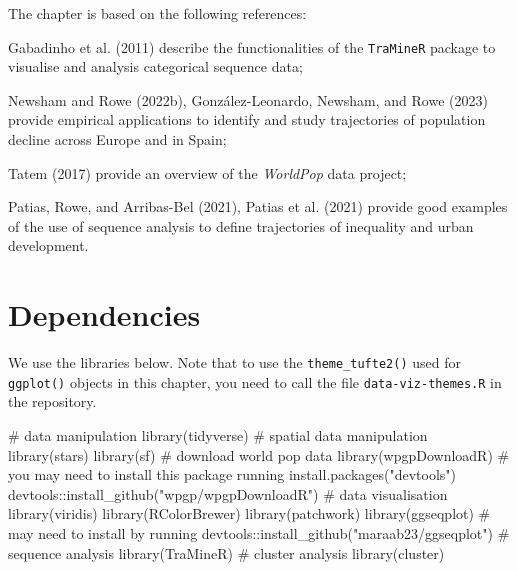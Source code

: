 \documentclass[
  letterpaper,
  DIV=11,
  numbers=noendperiod]{scrreprt}
\newenvironment{Shaded}{\begin{snugshade}}{\end{snugshade}}
\newcommand{\CommentTok}[1]{\textcolor[rgb]{0.37,0.37,0.37}{#1}}
\newcommand{\FunctionTok}[1]{\textcolor[rgb]{0.28,0.35,0.67}{#1}}
\newcommand{\NormalTok}[1]{\textcolor[rgb]{0.00,0.23,0.31}{#1}}
\begin{document}
The chapter is based on the following references:

Gabadinho et al. (2011) describe the functionalities of the
\texttt{TraMineR} package to visualise and analysis categorical sequence
data;

Newsham and Rowe (2022b), González-Leonardo, Newsham, and Rowe (2023)
provide empirical applications to identify and study trajectories of
population decline across Europe and in Spain;

Tatem (2017) provide an overview of the \emph{WorldPop} data project;

Patias, Rowe, and Arribas-Bel (2021), Patias et al. (2021) provide good
examples of the use of sequence analysis to define trajectories of
inequality and urban development.

\hypertarget{dependencies}{%
\section{Dependencies}\label{dependencies}}

We use the libraries below. Note that to use the
\texttt{theme\_tufte2()} used for \texttt{ggplot()} objects in this
chapter, you need to call the file \texttt{data-viz-themes.R} in the
repository.

\begin{Shaded}
\begin{Highlighting}[]
\CommentTok{\# data manipulation}
\FunctionTok{library}\NormalTok{(tidyverse)}
\CommentTok{\# spatial data manipulation}
\FunctionTok{library}\NormalTok{(stars)}
\FunctionTok{library}\NormalTok{(sf)}
\CommentTok{\# download world pop data}
\FunctionTok{library}\NormalTok{(wpgpDownloadR) }\CommentTok{\# you may need to install this package running \textasciigrave{}install.packages("devtools")\textasciigrave{} \textasciigrave{}devtools::install\_github("wpgp/wpgpDownloadR")\textquotesingle{}}
\CommentTok{\# data visualisation}
\FunctionTok{library}\NormalTok{(viridis)}
\FunctionTok{library}\NormalTok{(RColorBrewer)}
\FunctionTok{library}\NormalTok{(patchwork)}
\FunctionTok{library}\NormalTok{(ggseqplot) }\CommentTok{\# may need to install by running \textasciigrave{}devtools::install\_github("maraab23/ggseqplot")\textasciigrave{}}
\CommentTok{\# sequence analysis}
\FunctionTok{library}\NormalTok{(TraMineR)}
\CommentTok{\# cluster analysis}
\FunctionTok{library}\NormalTok{(cluster)}
\end{Highlighting}
\end{Shaded}
\end{document}
